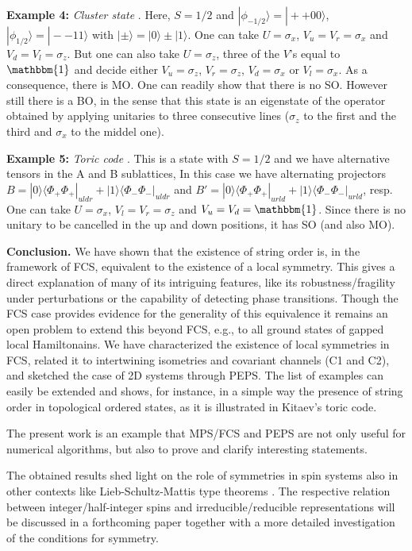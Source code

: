 \documentclass[prl,floatfix,showpacs,amsmat,twocolumn]{revtex4}
\newcommand{\1}{\mathbbm{1}}
\renewcommand{\>}{\rangle}
\newcommand{\<}{\langle}
\newcommand{\vs}{\vspace*{4pt}}
\begin{document}
{\bf Example 4:} {\em Cluster state} \cite{cluster}. Here, $S=1/2$
and $|\phi_{-1/2}\rangle=|++00\rangle$,
$|\phi_{1/2}\rangle=|--11\rangle$ with
$|\pm\rangle=|0\rangle\pm|1\rangle$. One can take $U=\sigma_x$,
$V_u=V_r=\sigma_x$ and $V_d=V_l=\sigma_z$. But one can also take
$U=\sigma_z$, three of the $V$'s equal to $\1$ and decide either
$V_u=\sigma_z$, $V_r=\sigma_z$, $V_d=\sigma_x$ or $V_l=\sigma_x$.
As a consequence, there is MO. One can readily show that there is
no SO. However still there is a BO, in the sense that this state
is an eigenstate of the operator obtained by applying unitaries to
three consecutive lines ($\sigma_z$ to the first and the third and
$\sigma_x$ to the middel one). \vs

{\bf Example 5:} {\em Toric code} \cite{Kitaev}. This is a state
with $S=1/2$ and we have alternative tensors in the A and B
sublattices, In this case we have alternating projectors
$B=|0\>\<\Phi_+\Phi_+|_{uldr}+|1\>\<\Phi_{-}\Phi_{-}|_{uldr}$ and
$B'=|0\>\<\Phi_+\Phi_+|_{urld}+|1\>\<\Phi_{-}\Phi_{-}|_{urld}$,
resp. One can take $U=\sigma_x$, $V_{l}=V_{r}=\sigma_z$ and
$V_{u}=V_{d}=\1$. Since there is no unitary to be cancelled in the
up and down positions, it has SO (and also MO).\vs


\textbf{Conclusion.} We have shown that the existence of string
order is, in the framework of FCS, equivalent to the existence of
a local symmetry. This gives a direct explanation of many of its
intriguing features, like its robustness/fragility under
perturbations or the capability of detecting phase transitions.
Though the FCS case provides evidence for the generality of this
equivalence it remains an open problem to extend this beyond FCS,
e.g., to all ground states of gapped local Hamiltonains. We have
characterized the existence of local symmetries in FCS, related it
to intertwining isometries and covariant channels (C1 and C2), and
sketched the case of 2D systems through PEPS. The list of examples
can easily be extended and shows, for instance, in a simple way
the presence of string order in topological ordered states, as it
is illustrated in Kitaev's toric code.

The present work is an example that MPS/FCS and PEPS are not only
useful for numerical algorithms, but also to prove and clarify
interesting statements.


The obtained results shed light on the role of symmetries in spin
systems also in other contexts like Lieb-Schultz-Mattis type
theorems \cite{Lieb}. The respective relation between
integer/half-integer spins and irreducible/reducible
representations will be discussed in a forthcoming paper
\cite{forthcoming} together with a more detailed investigation of
the conditions for symmetry.\vs
\end{document}
